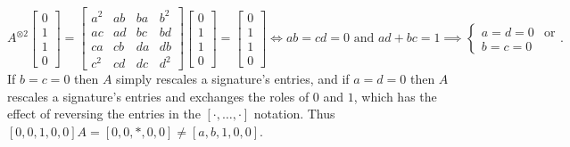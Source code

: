 \documentclass{article}
\theoremstyle{remark}
\theoremstyle{definition}
\begin{document}
\[
    A^{\otimes 2}
    \begin{bmatrix} 0 \\ 1 \\ 1 \\ 0 \end{bmatrix} =
    \begin{bmatrix} 
        a^2 & ab & ba & b^2 \\
        ac & ad & bc & bd \\
        ca & cb & da & db \\
        c^2 & cd & dc & d^2
    \end{bmatrix}
    \begin{bmatrix} 0 \\ 1 \\ 1 \\ 0 \end{bmatrix}
    = \begin{bmatrix} 0 \\ 1 \\ 1 \\ 0 \end{bmatrix}
    \iff ab = cd = 0 \text{ and } ad + bc = 1
    \implies \begin{cases} a = d = 0 & \text{or} \\ b = c = 0\end{cases}.
\]
If $b=c=0$ then $A$ simply rescales a signature's entries, and if $a=d=0$ then
$A$ rescales a signature's entries and exchanges the roles of $0$ and $1$, which has the effect of
reversing the entries in the $[\cdot,\ldots,\cdot]$ notation. Thus $[0,0,1,0,0]A = [0,0,*,0,0]
\neq [a,b,1,0,0]$.
\end{document}
